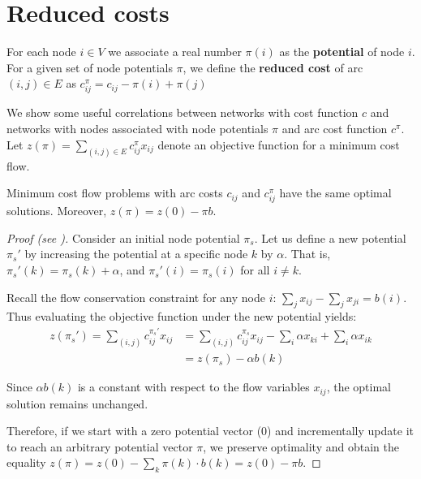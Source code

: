 \section{Reduced costs}
\begin{defn}\label{def:reduced_cost}
For each node $i \in V$ we associate a real number $\pi(i)$ as the \textbf{potential} of node $i$. For a given set of node potentials $\pi$, we define the \textbf{reduced cost} of arc $(i,j) \in E$ as $c^\pi_{ij} = c_{ij} - \pi(i) + \pi(j) $ 
\end{defn}

We show some useful correlations between networks with cost function $c$ and networks with nodes associated with node potentials $\pi$ and arc cost function $c^\pi$. Let $z(\pi) = \sum_{(i,j) \in E} c^\pi_{ij}x_{ij}$ denote an objective function for a minimum cost flow.

\begin{lemma}
\label{reduced_equiv}
Minimum cost flow problems with arc costs $c_{ij}$ and $c_{ij}^\pi$ have the same optimal solutions. Moreover, $z(\pi) = z(0) - \pi b$.
\end{lemma}
\begin{proof}[Proof (see{ \cite[p.~43]{ahuja1993network}})]
Consider an initial node potential $\pi_s$. Let us define a new potential $\pi_s'$ by increasing the potential at a specific node $k$ by $\alpha$. That is, $\pi_s'(k) = \pi_s(k) + \alpha$, and $\pi_s'(i) = \pi_s(i)$ for all $i \neq k$. 

Recall the flow conservation constraint for any node $i$: $\sum_j x_{ij} - \sum_j x_{ji} = b(i)$. Thus evaluating the objective function under the new potential yields:
\begin{align*}
    z(\pi_s') = \sum_{(i,j)} c^{\pi_s'}_{ij} x_{ij} 
    &= \sum_{(i,j)} c^{\pi_s}_{ij} x_{ij} - \sum_i \alpha x_{ki} + \sum_i \alpha x_{ik} \\
    &= z(\pi_s) - \alpha b(k)
\end{align*}

Since $\alpha b(k)$ is a constant with respect to the flow variables $x_{ij}$, the optimal solution remains unchanged. 

Therefore, if we start with a zero potential vector ($0$) and incrementally update it to reach an arbitrary potential vector $\pi$, we preserve optimality and obtain the equality $z(\pi) =z(0)- \sum_k \pi(k)\cdot b(k)=  z(0) - \pi b$.
\end{proof}

